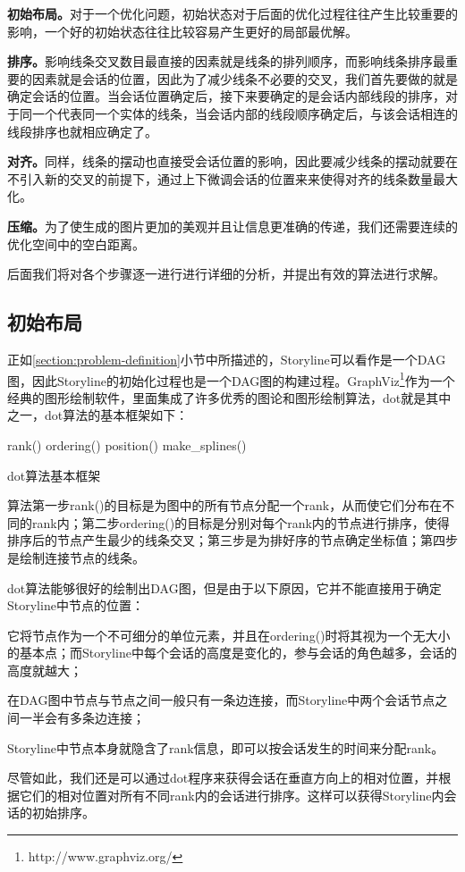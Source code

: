 \begin{asparaenum}[(a)]
\item\textbf{初始布局。}对于一个优化问题，初始状态对于后面的优化过程往往产生比较重要的影响，一个好的初始状态往往比较容易产生更好的局部最优解。
\item\textbf{排序。}影响线条交叉数目最直接的因素就是线条的排列顺序，而影响线条排序最重要的因素就是会话的位置，因此为了减少线条不必要的交叉，我们首先要做的就是确定会话的位置。当会话位置确定后，接下来要确定的是会话内部线段的排序，对于同一个代表同一个实体的线条，当会话内部的线段顺序确定后，与该会话相连的线段排序也就相应确定了。
\item\textbf{对齐。}同样，线条的摆动也直接受会话位置的影响，因此要减少线条的摆动就要在不引入新的交叉的前提下，通过上下微调会话的位置来来使得对齐的线条数量最大化。
\item\textbf{压缩。}为了使生成的图片更加的美观并且让信息更准确的传递，我们还需要连续的优化空间中的空白距离。
\end{asparaenum}
后面我们将对各个步骤逐一进行进行详细的分析，并提出有效的算法进行求解。

\subsection{初始布局}
正如\ref{section:problem-definition}小节中所描述的，Storyline可以看作是一个DAG图，因此Storyline的初始化过程也是一个DAG图的构建过程。GraphViz\footnote{http://www.graphviz.org/}作为一个经典的图形绘制软件，里面集成了许多优秀的图论和图形绘制算法，dot\cite{Koutsofios1991, Gansner1993a}就是其中之一，dot算法的基本框架如下：
\begin{algorithm}[htb]
  rank()\;
  ordering()\;
  position()\;
  make\_splines()\;
  \caption{dot算法基本框架}
  \label{algo:draw-graph}
\end{algorithm}
算法第一步rank()的目标是为图中的所有节点分配一个rank，从而使它们分布在不同的rank内；第二步ordering()的目标是分别对每个rank内的节点进行排序，使得排序后的节点产生最少的线条交叉；第三步是为排好序的节点确定坐标值；第四步是绘制连接节点的线条。

dot算法能够很好的绘制出DAG图，但是由于以下原因，它并不能直接用于确定Storyline中节点的位置：
\begin{inparaenum}[\itshape 1 \upshape)]
\item 它将节点作为一个不可细分的单位元素，并且在ordering()时将其视为一个无大小的基本点；而Storyline中每个会话的高度是变化的，参与会话的角色越多，会话的高度就越大；
\item 在DAG图中节点与节点之间一般只有一条边连接，而Storyline中两个会话节点之间一半会有多条边连接；
\item Storyline中节点本身就隐含了rank信息，即可以按会话发生的时间来分配rank。
\end{inparaenum}
尽管如此，我们还是可以通过dot程序来获得会话在垂直方向上的相对位置，并根据它们的相对位置对所有不同rank内的会话进行排序。这样可以获得Storyline内会话的初始排序。

